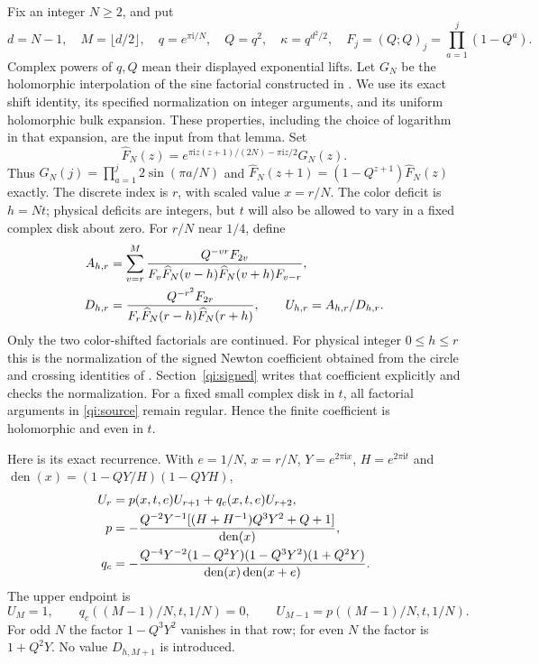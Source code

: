 \documentclass[11pt]{article}
\numberwithin{equation}{section}
\theoremstyle{remark}\newtheorem{remark}[theorem]{Remark}
\newcommand{\ii}{\mathrm i}
\begin{document}
Fix an integer $N\ge2$, and put
\[
 d=N-1,\quad M=\lfloor d/2\rfloor,\quad q=e^{\pi\ii/N},
 \quad Q=q^2,\quad \kappa=q^{d^2/2},\quad
 F_j=(Q;Q)_j=\prod_{a=1}^j(1-Q^a).
\]
Complex powers of $q,Q$ mean their displayed exponential lifts.
Let $G_N$ be the holomorphic interpolation of the sine factorial
constructed in \cite[Lemma 2.1]{Conway}. We use its exact shift
identity, its specified normalization on integer arguments, and its
uniform holomorphic bulk expansion. These properties, including the
choice of logarithm in that expansion, are the input from that lemma.
Set
\[
 \widehat F_N(z)=e^{\pi\ii z(z+1)/(2N)-\pi\ii z/2}G_N(z).
\]
Thus $G_N(j)=\prod_{a=1}^j2\sin(\pi a/N)$ and
$\widehat F_N(z+1)=(1-Q^{z+1})\widehat F_N(z)$ exactly.
The discrete index is $r$, with scaled value $x=r/N$. The color
deficit is $h=Nt$; physical deficits are integers, but $t$ will also
be allowed to vary in a fixed complex disk about zero. For $r/N$
near $1/4$, define
\begin{align}
 A_{h,r}
 &=\sum_{v=r}^{M}
 \frac{Q^{-vr}F_{2v}}
 {F_v\widehat F_N(v-h)\widehat F_N(v+h)F_{v-r}},\notag\\
 D_{h,r}
 &=\frac{Q^{-r^2}F_{2r}}
 {F_r\widehat F_N(r-h)\widehat F_N(r+h)},\qquad
 U_{h,r}=A_{h,r}/D_{h,r}.\label{qi:source}
\end{align}
Only the two color-shifted factorials are continued. For physical integer $0\le h\le r$ this is the normalization of the signed Newton coefficient obtained from the circle and crossing identities of \cite[Proposition 4.1 and equation (4.8)]{Newton}. Section~\ref{qi:signed} writes that coefficient explicitly and checks the normalization. For a fixed small complex disk in $t$, all factorial arguments in \eqref{qi:source} remain regular. Hence the finite coefficient is holomorphic and even in $t$.

Here is its exact recurrence. With $e=1/N$, $x=r/N$, $Y=e^{2\pi\ii x}$, $H=e^{2\pi\ii t}$ and
$\operatorname{den}(x)=(1-QY/H)(1-QYH)$,
\begin{align}
 U_r&=p(x,t,e)U_{r+1}+q_c(x,t,e)U_{r+2},\label{qi:recurrence}\\
 p&=-\frac{Q^{-2}Y^{-1}[(H+H^{-1})Q^3Y^2+Q+1]}
                {\operatorname{den}(x)},\notag\\
 q_c&=-\frac{Q^{-4}Y^{-2}(1-Q^2Y)(1-Q^3Y^2)(1+Q^2Y)}
                {\operatorname{den}(x)\operatorname{den}(x+e)}.\notag
\end{align}
The upper endpoint is
\begin{equation}\label{qi:wall}
 U_M=1,\qquad q_c((M-1)/N,t,1/N)=0,\qquad U_{M-1}=p((M-1)/N,t,1/N).
\end{equation}
For odd $N$ the factor $1-Q^3Y^2$ vanishes in that row; for even $N$ the factor is $1+Q^2Y$. No value $D_{h,M+1}$ is introduced.
\end{document}
